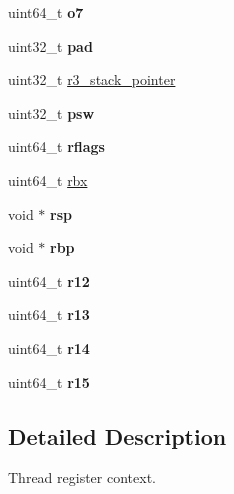 \begin{DoxyCompactItemize}
uint64\+\_\+t {\bfseries o7}
\item 
\mbox{\label{structContext__Control_a8a720b5a8f00360eb387c91235c6d6bb}} 
uint32\+\_\+t {\bfseries pad}
\item 
uint32\+\_\+t \mbox{\hyperlink{structContext__Control_ac6994ddfd3c299326a422b5c87783258}{r3\+\_\+stack\+\_\+pointer}}
\item 
\mbox{\label{structContext__Control_afff32732e5a95545c102304c099a5f18}} 
uint32\+\_\+t {\bfseries psw}
\item 
\mbox{\label{structContext__Control_a599d3bfd2c95d17d2c730ed546e0288a}} 
uint64\+\_\+t {\bfseries rflags}
\item 
uint64\+\_\+t \mbox{\hyperlink{structContext__Control_a5a461836201d44bd52d0dbcb462f78d9}{rbx}}
\item 
\mbox{\label{structContext__Control_a9813e0b17f078e39b3748c2639efd4a9}} 
void $\ast$ {\bfseries rsp}
\item 
\mbox{\label{structContext__Control_aa2a96d4b7036862d19f22bec1a71d3c3}} 
void $\ast$ {\bfseries rbp}
\item 
\mbox{\label{structContext__Control_a90c2aba41f671d7450493868be884d6a}} 
uint64\+\_\+t {\bfseries r12}
\item 
\mbox{\label{structContext__Control_a737d1bc502986ce1d059fa40877e72ba}} 
uint64\+\_\+t {\bfseries r13}
\item 
\mbox{\label{structContext__Control_ade8f02f66c762da6ffe6238e7333942f}} 
uint64\+\_\+t {\bfseries r14}
\item 
\mbox{\label{structContext__Control_a38a2569d3bfbd1ae45ab1b2cf2e85624}} 
uint64\+\_\+t {\bfseries r15}
\end{DoxyCompactItemize}


\subsection{Detailed Description}
Thread register context. 

